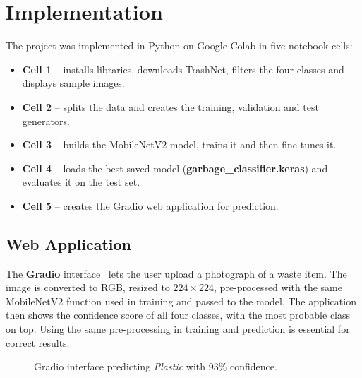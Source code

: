 \section{Implementation}
The project was implemented in Python on Google Colab in five notebook cells:
\begin{itemize}
  \item \textbf{Cell 1} -- installs libraries, downloads TrashNet, filters the four classes and displays sample images.
  \item \textbf{Cell 2} -- splits the data and creates the training, validation and test generators.
  \item \textbf{Cell 3} -- builds the MobileNetV2 model, trains it and then fine-tunes it.
  \item \textbf{Cell 4} -- loads the best saved model (\textbf{garbage\_classifier.keras}) and evaluates it on the test set.
  \item \textbf{Cell 5} -- creates the Gradio web application for prediction.
\end{itemize}

\subsection{Web Application}
The \textbf{Gradio} interface~\cite{gradio} lets the user upload a photograph of a waste item. The image is converted to RGB, resized to $224\times224$, pre-processed with the same MobileNetV2 function used in training and passed to the model. The application then shows the confidence score of all four classes, with the most probable class on top. Using the same pre-processing in training and prediction is essential for correct results.

\begin{figure}[h]
  \centering
  \screenshot
  \caption{Gradio interface predicting \textit{Plastic} with 93\% confidence.}
\end{figure}
